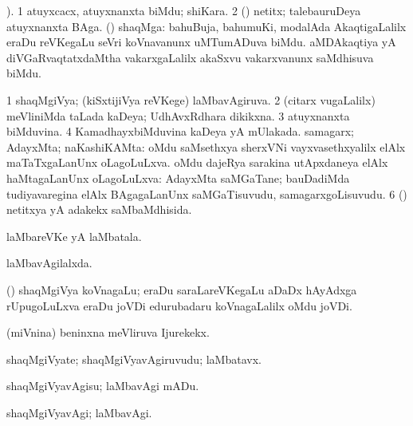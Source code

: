 \bentry
{} 
\gl{\nA}
). \bmng
\bnum
\num{1} atuyxcacx, atuyxnanxta biMdu; shiKara. 
\num{2} (\aMrashA) netitx; talebauruDeya atuyxnanxta BAga. 
 (\jAyx) shaqMga: 
\banum
{} bahuBuja, bahumuKi, modalAda AkaqtigaLalilx eraDu reVKegaLu seVri koVnavanunx uMTumADuva biMdu. 
 aMDAkaqtiya yA diVGaRvaqtatxdaMtha vakarxgaLalilx akaSxvu vakarxvanunx saMdhisuva biMdu. 
\eanum
\numie
\enum
\emng
\eentry

\bentry
{} 
\gl{\gu}
\expl{}
\bmng
\bnum
\num{1} shaqMgiVya; (kiSxtijiVya reVKege) laMbavAgiruva. 
\num{2} (citarx \mo vugaLalilx) meVliniMda taLada kaDeya; UdhAvxRdhara dikikxna. 
\num{3} atuyxnanxta biMduvina. 
\num{4} KamadhayxbiMduvina kaDeya yA mUlakada. 
 samagarx; AdayxMta; naKashiKAMta: 
\banum
{} oMdu saMsethxya sherxVNi vayxvasethxyalilx elAlx maTaTxgaLanUnx oLagoLuLxva. 
 oMdu dajeRya sarakina utApxdaneya elAlx haMtagaLanUnx oLagoLuLxva:  AdayxMta saMGaTane; bauDadiMda tudiyavaregina elAlx BAgagaLanUnx saMGaTisuvudu, samagarxgoLisuvudu. 
\eanum
\numie
\num{6} (\aMrashA) netitxya yA adakekx saMbaMdhisida. 
\enum
\emng
\eentry

\bentry
{} 
\gl{\nA}
\expl{}
\bmng
laMbareVKe yA laMbatala. 
\emng

\noindent 
\gl{\pagu}
\expl{}
\bmng
  laMbavAgilalxda. 
\emng
\eentry

\bentry
{}
\gl{\nA}
\expl{}
\bmng
 (\ga) shaqMgiVya koVnagaLu; eraDu saraLareVKegaLu aDaDx hAyAdxga rUpugoLuLxva eraDu joVDi edurubadaru koVnagaLalilx oMdu joVDi. 
\emng
\eentry

\bentry
{}
\gl{\nA}
\expl{}
\bmng
 (miVnina) beninxna meVliruva Ijurekekx. 
\emng
\eentry

\bentry
{}
\gl{\nA}
\expl{}
\bmng
 shaqMgiVyate; shaqMgiVyavAgiruvudu; laMbatavx. 
\emng
\eentry

\bentry
{} 
\gl{\sakirx}
\expl{}
\bmng
 shaqMgiVyavAgisu; laMbavAgi mADu. 
\emng
\eentry

\bentry
{} 
\gl{\kirxvi}
\expl{}
\bmng
 shaqMgiVyavAgi; laMbavAgi. 
\emng
\eentry

